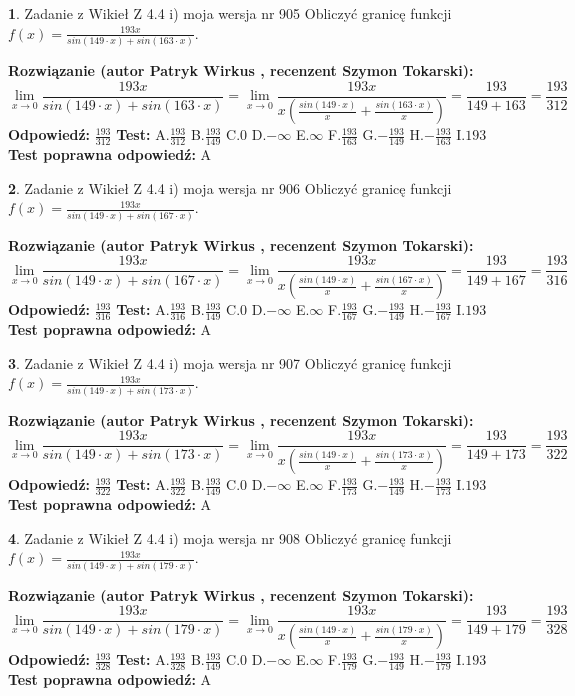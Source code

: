 \documentclass[12pt, a4paper]{article}
\theoremstyle{definition} %
\newtheorem{zad}{}
\newcommand{\zadStart}[1]{\begin{zad}#1\newline}
\newcommand{\zadStop}{\end{zad}}
\newcommand{\rozwStart}[2]{\noindent \textbf{Rozwiązanie (autor #1 , recenzent #2): }\newline}
\newcommand{\rozwStop}{\newline}
\newcommand{\odpStart}{\noindent \textbf{Odpowiedź:}\newline}
\newcommand{\odpStop}{\newline}
\newcommand{\testStart}{\noindent \textbf{Test:}\newline}
\newcommand{\testStop}{\newline}
\newcommand{\kluczStart}{\noindent \textbf{Test poprawna odpowiedź:}\newline}
\newcommand{\kluczStop}{\newline}
\begin{document}
\zadStart{Zadanie z Wikieł Z 4.4 i) moja wersja nr 905}
Obliczyć granicę funkcji $f(x)=\frac{193x}{sin(149\cdot x) +sin(163\cdot x)}$.
\zadStop
\rozwStart{Patryk Wirkus}{Szymon Tokarski}
$$\lim\limits_{x\to 0}\frac{193x}{sin(149\cdot x) +sin(163\cdot x)}=\lim\limits_{x\to 0}\frac{193x}{x(\frac{sin(149\cdot x)}{x}+\frac{sin(163\cdot x)}{x})}=\frac{193}{149+163} = \frac{193}{312}$$
\rozwStop
\odpStart
$\frac{193}{312}$
\odpStop
\testStart
A.$\frac{193}{312}$
B.$\frac{193}{149}$
C.$0$
D.$-\infty$
E.$\infty$
F.$\frac{193}{163}$
G.$-\frac{193}{149}$
H.$-\frac{193}{163}$
I.$193$
\testStop
\kluczStart
A
\kluczStop



\zadStart{Zadanie z Wikieł Z 4.4 i) moja wersja nr 906}
Obliczyć granicę funkcji $f(x)=\frac{193x}{sin(149\cdot x) +sin(167\cdot x)}$.
\zadStop
\rozwStart{Patryk Wirkus}{Szymon Tokarski}
$$\lim\limits_{x\to 0}\frac{193x}{sin(149\cdot x) +sin(167\cdot x)}=\lim\limits_{x\to 0}\frac{193x}{x(\frac{sin(149\cdot x)}{x}+\frac{sin(167\cdot x)}{x})}=\frac{193}{149+167} = \frac{193}{316}$$
\rozwStop
\odpStart
$\frac{193}{316}$
\odpStop
\testStart
A.$\frac{193}{316}$
B.$\frac{193}{149}$
C.$0$
D.$-\infty$
E.$\infty$
F.$\frac{193}{167}$
G.$-\frac{193}{149}$
H.$-\frac{193}{167}$
I.$193$
\testStop
\kluczStart
A
\kluczStop



\zadStart{Zadanie z Wikieł Z 4.4 i) moja wersja nr 907}
Obliczyć granicę funkcji $f(x)=\frac{193x}{sin(149\cdot x) +sin(173\cdot x)}$.
\zadStop
\rozwStart{Patryk Wirkus}{Szymon Tokarski}
$$\lim\limits_{x\to 0}\frac{193x}{sin(149\cdot x) +sin(173\cdot x)}=\lim\limits_{x\to 0}\frac{193x}{x(\frac{sin(149\cdot x)}{x}+\frac{sin(173\cdot x)}{x})}=\frac{193}{149+173} = \frac{193}{322}$$
\rozwStop
\odpStart
$\frac{193}{322}$
\odpStop
\testStart
A.$\frac{193}{322}$
B.$\frac{193}{149}$
C.$0$
D.$-\infty$
E.$\infty$
F.$\frac{193}{173}$
G.$-\frac{193}{149}$
H.$-\frac{193}{173}$
I.$193$
\testStop
\kluczStart
A
\kluczStop



\zadStart{Zadanie z Wikieł Z 4.4 i) moja wersja nr 908}
Obliczyć granicę funkcji $f(x)=\frac{193x}{sin(149\cdot x) +sin(179\cdot x)}$.
\zadStop
\rozwStart{Patryk Wirkus}{Szymon Tokarski}
$$\lim\limits_{x\to 0}\frac{193x}{sin(149\cdot x) +sin(179\cdot x)}=\lim\limits_{x\to 0}\frac{193x}{x(\frac{sin(149\cdot x)}{x}+\frac{sin(179\cdot x)}{x})}=\frac{193}{149+179} = \frac{193}{328}$$
\rozwStop
\odpStart
$\frac{193}{328}$
\odpStop
\testStart
A.$\frac{193}{328}$
B.$\frac{193}{149}$
C.$0$
D.$-\infty$
E.$\infty$
F.$\frac{193}{179}$
G.$-\frac{193}{149}$
H.$-\frac{193}{179}$
I.$193$
\testStop
\kluczStart
A
\kluczStop
\end{document}
